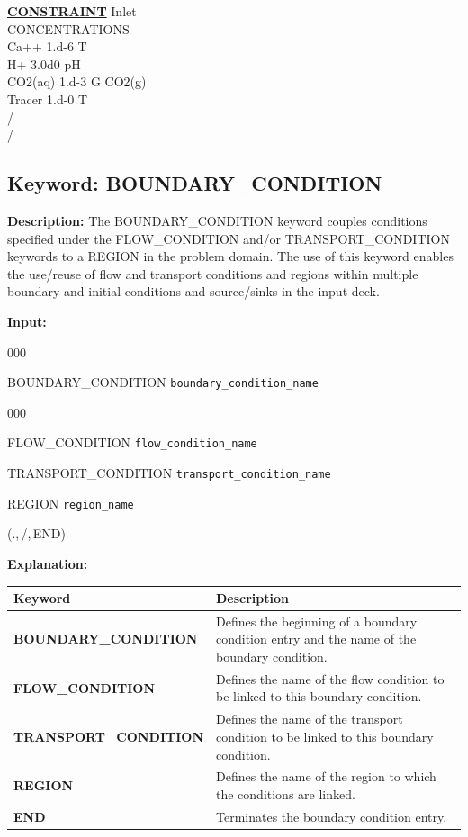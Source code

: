 \documentclass[12pt]{article}
\newcommand\keyend{{(.,\,/,\,END)}}
\begin{document}
\noindent
\hyperlink{target_constraint}{\bf CONSTRAINT} Inlet\\
CONCENTRATIONS\\
Ca++    1.d-6   T\\
H+      3.0d0  pH\\
CO2(aq) 1.d-3   G  CO2(g)\\
Tracer  1.d-0   T\\
/\\
/
\normalsize

\newpage
\protect\hypertarget{target_bcon}{}

\subsection{Keyword: BOUNDARY\_CONDITION}
{\noindent\bf Description:}
The BOUNDARY\_CONDITION keyword couples conditions specified under the FLOW\_\-CONDITION and/or TRANSPORT\_CONDITION keywords to a REGION in the problem domain.  The use of this keyword enables the use/reuse of flow and transport conditions and regions within multiple boundary and initial conditions and source/sinks in the input deck.

{\noindent\bf Input:}

\begin{deflist}{000}
\item[BOUNDARY\_CONDITION] {\tt boundary\_condition\_name}
\begin{deflist}{000}
\item[FLOW\_CONDITION] {\tt flow\_condition\_name}
\item[TRANSPORT\_CONDITION] {\tt transport\_condition\_name}
\item[REGION] {\tt region\_name}
\end{deflist}
\item[\keyend]
\end{deflist}

{\noindent\bf Explanation:}

\begin{center}
\begin{tabularx}{\linewidth}{lX}
\toprule[1.5pt]
\bf Keyword & \bf Description\\
\midrule
\bf BOUNDARY\_CONDITION & Defines the beginning of a boundary condition entry and the name of the boundary condition.\\
\midrule
\bf FLOW\_CONDITION & Defines the name of the flow condition to be linked to this boundary condition.\\
\midrule
\bf TRANSPORT\_CONDITION & Defines the name of the transport condition to be linked to this boundary condition.\\
\midrule
\bf REGION & Defines the name of the region to which the conditions are linked.\\
\midrule
\bf END & Terminates the boundary condition entry.\\
\bottomrule[1.5pt]
\end{tabularx}
\end{center}
\end{document}
